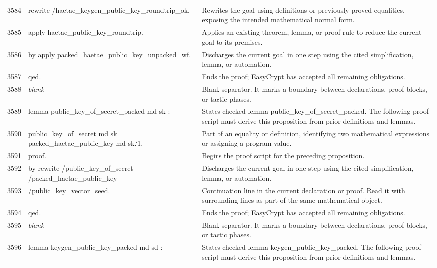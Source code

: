 \documentclass[10pt]{article}
\begin{document}
\begin{longtable}{r L{0.53\textwidth} L{0.37\textwidth}}
3584 & {\ttfamily\scriptsize rewrite /haetae\_keygen\_public\_key\_roundtrip\_ok.} & Rewrites the goal using definitions or previously proved equalities, exposing the intended mathematical normal form. \\
3585 & {\ttfamily\scriptsize apply haetae\_public\_key\_roundtrip.} & Applies an existing theorem, lemma, or proof rule to reduce the current goal to its premises. \\
3586 & {\ttfamily\scriptsize by apply packed\_haetae\_public\_key\_unpacked\_wf.} & Discharges the current goal in one step using the cited simplification, lemma, or automation. \\
3587 & {\ttfamily\scriptsize qed.} & Ends the proof; EasyCrypt has accepted all remaining obligations. \\
3588 & {\ttfamily\scriptsize \emph{blank}} & Blank separator.  It marks a boundary between declarations, proof blocks, or tactic phases. \\
3589 & {\ttfamily\scriptsize lemma public\_key\_of\_secret\_packed md sk :} & States checked lemma public\_key\_of\_secret\_packed.  The following proof script must derive this proposition from prior definitions and lemmas. \\
3590 & {\ttfamily\scriptsize   public\_key\_of\_secret md sk = packed\_haetae\_public\_key md sk.`1.} & Part of an equality or definition, identifying two mathematical expressions or assigning a program value. \\
3591 & {\ttfamily\scriptsize proof.} & Begins the proof script for the preceding proposition. \\
3592 & {\ttfamily\scriptsize by rewrite /public\_key\_of\_secret /packed\_haetae\_public\_key} & Discharges the current goal in one step using the cited simplification, lemma, or automation. \\
3593 & {\ttfamily\scriptsize            /public\_key\_vector\_seed.} & Continuation line in the current declaration or proof.  Read it with surrounding lines as part of the same mathematical object. \\
3594 & {\ttfamily\scriptsize qed.} & Ends the proof; EasyCrypt has accepted all remaining obligations. \\
3595 & {\ttfamily\scriptsize \emph{blank}} & Blank separator.  It marks a boundary between declarations, proof blocks, or tactic phases. \\
3596 & {\ttfamily\scriptsize lemma keygen\_public\_key\_packed md sd :} & States checked lemma keygen\_public\_key\_packed.  The following proof script must derive this proposition from prior definitions and lemmas. \\

\end{longtable}
\end{document}
